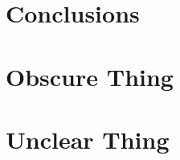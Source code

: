\documentclass[10pt, twocolumn, twoside]{IEEEtran}
\begin{document}
\section{Conclusions}

\lipsum[28]



\appendices

\section{Obscure Thing}

\lipsum[38]

\section{Unclear Thing}

\lipsum[39-41]
\end{document}
